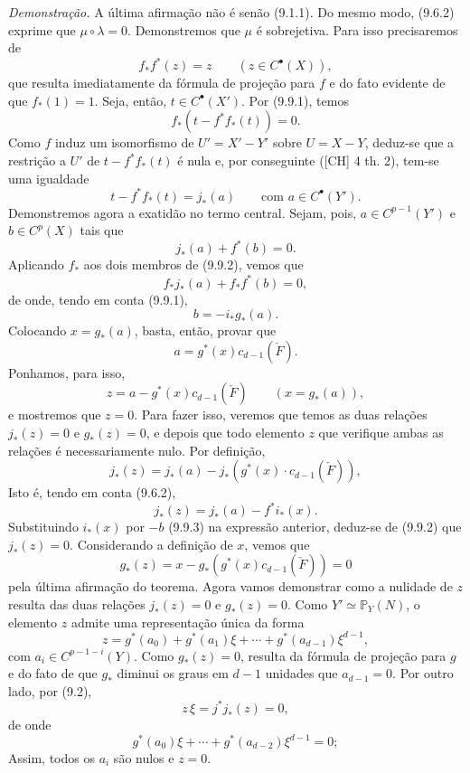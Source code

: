 \emph{Demonstração.} A última afirmação não é senão (9.1.1). Do mesmo modo, (9.6.2) exprime que $\mu\circ\lambda=0$. Demonstremos que $\mu$ é sobrejetiva. Para isso precisaremos de
\[
f_*f^*(z)=z\qquad(z\in C^{\bullet}(X)),
\tag{9.9.1}
\]
que resulta imediatamente da fórmula de projeção para $f$ e do fato evidente de que $f_*(1)=1$. Seja, então, $t\in C^{\bullet}(X')$. Por (9.9.1), temos
\[
f_*(t-f^*f_*(t))=0.
\]
Como $f$ induz um isomorfismo de $U'=X'-Y'$ sobre $U=X-Y$, deduz-se que a restrição a $U'$ de $t-f^*f_*(t)$ é nula e, por conseguinte ([CH] 4 th. 2), tem-se uma igualdade
\[
t-f^*f_*(t)=j_*(a)
\qquad\text{com }a\in C^{\bullet}(Y').
\]
Demonstremos agora a exatidão no termo central. Sejam, pois, $a\in C^{p-1}(Y')$ e $b\in C^p(X)$ tais que
\[
j_*(a)+f^*(b)=0.
\tag{9.9.2}
\]
Aplicando $f_*$ aos dois membros de (9.9.2), vemos que
\[
f_*j_*(a)+f_*f^*(b)=0,
\]
de onde, tendo em conta (9.9.1),
\[
b=-i_*g_*(a).
\tag{9.9.3}
\]
Colocando $x=g_*(a)$, basta, então, provar que
\[
a=g^*(x)c_{d-1}(\check F).
\tag{9.9.4}
\]
Ponhamos, para isso,
\[
z=a-g^*(x)c_{d-1}(\check F)\qquad(x=g_*(a)),
\]
e mostremos que $z=0$. Para fazer isso, veremos que temos as duas relações $j_*(z)=0$ e $g_*(z)=0$, e depois que todo elemento $z$ que verifique ambas as relações é necessariamente nulo. Por definição,
\[
j_*(z)=j_*(a)-j_*(g^*(x)\cdot c_{d-1}(\check F)),
\]
Isto é, tendo em conta (9.6.2),
\[
j_*(z)=j_*(a)-f^*i_*(x).
\]
Substituindo $i_*(x)$ por $-b$ (9.9.3) na expressão anterior, deduz-se de (9.9.2) que $j_*(z)=0$. Considerando a definição de $x$, vemos que
\[
g_*(z)=x-g_*(g^*(x)c_{d-1}(\check F))=0
\]
pela última afirmação do teorema. Agora vamos demonstrar como a nulidade de $z$ resulta das duas relações $j_*(z)=0$ e $g_*(z)=0$. Como $Y'\simeq\mathbb P_Y(N)$, o elemento $z$ admite uma representação única da forma
\[
z=g^*(a_0)+g^*(a_1)\xi+\cdots+g^*(a_{d-1})\xi^{d-1},
\]
com $a_i\in C^{p-1-i}(Y)$. Como $g_*(z)=0$, resulta da fórmula de projeção para $g$ e do fato de que $g_*$ diminui os graus em $d-1$ unidades que $a_{d-1}=0$. Por outro lado, por (9.2),
\[
z\,\xi=j^*j_*(z)=0,
\]
de onde
\[
g^*(a_0)\xi+\cdots+g^*(a_{d-2})\xi^{d-1}=0;
\]
Assim, todos os $a_i$ são nulos e $z=0$.
